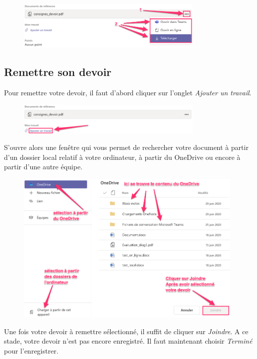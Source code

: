 \begin{figure}[H]
\includegraphics[width=9cm]{./images/teams/choix_pointilles}
\centering
\end{figure}

\subsection{Remettre son devoir}\label{TeamsRemettreDevoir}

Pour remettre votre devoir, il faut d'abord cliquer sur l'onglet \textit{Ajouter un travail}. 

\begin{figure}[H]
\includegraphics[width=9cm]{./images/teams/ajout}
\centering
\end{figure}

S'ouvre alors une fenêtre qui vous permet de rechercher votre document à partir d'un dossier local relatif à votre ordinateur, à partir du OneDrive ou encore à partir d'une autre équipe.

\begin{figure}[H]
\includegraphics[width=11cm]{./images/teams/selection_devoir}
\centering
\end{figure}

Une fois votre devoir à remettre sélectionné, il suffit de cliquer sur \textit{Joindre}. A ce stade, votre devoir n'est pas encore enregistré. Il faut maintenant choisir \textit{Terminé} pour l'enregistrer.

